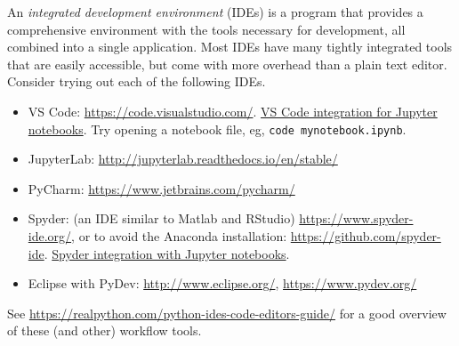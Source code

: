 An \emph{integrated development environment} (IDEs) is a program that provides a comprehensive environment with the tools necessary for development, all combined into a single application.
Most IDEs have many tightly integrated tools that are easily accessible, but come with more overhead than a plain text editor.
Consider trying out each of the following IDEs.
\begin{itemize}
\item {VS Code}: \url{https://code.visualstudio.com/}. \href{https://code.visualstudio.com/docs/python/jupyter-support}{VS
Code integration for Jupyter notebooks}. Try opening a notebook file,
eg, \lstinline{code mynotebook.ipynb}.

\item JupyterLab: \url{http://jupyterlab.readthedocs.io/en/stable/}

\item PyCharm: \url{https://www.jetbrains.com/pycharm/}

\item Spyder: (an IDE similar to
Matlab and RStudio) \url{https://www.spyder-ide.org/}, or to avoid the
Anaconda
installation: \url{https://github.com/spyder-ide}. \href{https://github.com/spyder-ide/spyder-notebook}{Spyder
integration with Jupyter notebooks}.


\item Eclipse with PyDev: \url{http://www.eclipse.org/}, \url{https://www.pydev.org/}
%
\end{itemize}
See \url{https://realpython.com/python-ides-code-editors-guide/} for a good overview of these (and other) workflow tools.
